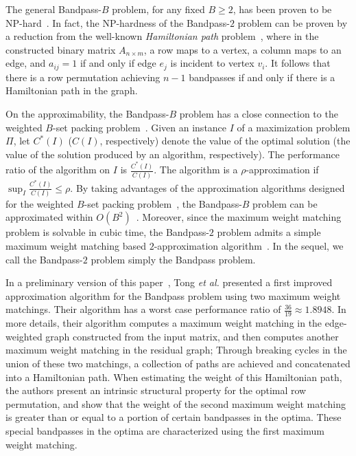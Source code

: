 \documentclass[11pt,twoside]{article}\usepackage{amssymb,latexsym,graphicx,hyperref}\usepackage{epstopdf}
\begin{document}
The general Bandpass-$B$ problem, for any fixed $B \ge 2$, has been proven to be NP-hard~\cite{Lin11}.
In fact, the NP-hardness of the Bandpass-$2$ problem can be proven by a reduction from the well-known {\em Hamiltonian path} problem~\cite{GJ79},
where in the constructed binary matrix $A_{n \times m}$, a row maps to a vertex, a column maps to an edge,
and $a_{ij} = 1$ if and only if edge $e_j$ is incident to vertex $v_i$.
It follows that there is a row permutation achieving $n-1$ bandpasses if and only if there is a Hamiltonian path in the graph.


On the approximability, the Bandpass-$B$ problem has a close connection to the weighted $B$-set packing problem~\cite{GJ79}.
Given an instance $I$ of a maximization problem $\Pi$,
let $C^*(I)$ ($C(I)$, respectively) denote the value of the optimal solution (the value of the solution produced by an algorithm, respectively).
The performance ratio of the algorithm on $I$ is $\frac {C^*(I)}{C(I)}$.
The algorithm is a $\rho$-approximation if $\sup_I \frac {C^*(I)}{C(I)} \le \rho$.
By taking advantages of the approximation algorithms designed for the weighted $B$-set packing problem~\cite{AH98,CH99},
the Bandpass-$B$ problem can be approximated within $O(B^2)$~\cite{Lin11}.
Moreover, since the maximum weight matching problem is solvable in cubic time,
the Bandpass-$2$ problem admits a simple maximum weight matching based $2$-approximation algorithm~\cite{Lin11}.
In the sequel, we call the Bandpass-$2$ problem simply the Bandpass problem.


In a preliminary version of this paper~\cite{TGD12},
Tong {\it et al.} presented a first improved approximation algorithm for the Bandpass problem using two maximum weight matchings.
Their algorithm has a worst case performance ratio of $\frac {36}{19} \approx 1.8948$.
In more details, their algorithm computes a maximum weight matching in the edge-weighted graph constructed from the input matrix,
and then computes another maximum weight matching in the residual graph;
Through breaking cycles in the union of these two matchings, a collection of paths are achieved and concatenated into a Hamiltonian path.
When estimating the weight of this Hamiltonian path, the authors present an intrinsic structural property for the optimal row permutation,
and show that the weight of the second maximum weight matching is greater than or equal to a portion of certain bandpasses in the optima.
These special bandpasses in the optima are characterized using the first maximum weight matching.
\end{document}
